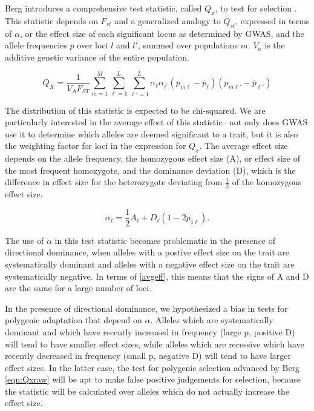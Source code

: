 \documentclass[a4paper,11pt]{article}
\begin{document}
Berg introduces a comprehensive test statistic, called $Q_x$, to test
for selection \cite{gwasintro}. This statistic depends on $F_{st}$ and
a generalized analogy to $Q_{st}$, expressed in terms of $\alpha$, or
the effect size of each significant locus as determined by GWAS, and
the allele frequencies $p$ over loci $l$ and $l'$, summed over
populations $m$. $V_a$ is the additive genetic variance of the entire population.

\begin{equation} \label{eqn:Qxraw}
  Q_X = \frac{1}{V_A F_{ST}} \sum_{m=1}^M \sum_{\ell=1}^L \sum_{\ell\prime=1}^L \alpha_{\ell} \alpha_{\ell^{\prime}}\left(p_{m\ell} - \overline{p}_\ell \right)\left(p_{m \ell\prime} - \overline{p}_{\ell\prime}\right)
\end{equation}

The distribution of this statistic is expected to be chi-squared. We are particularly interested in the average effect of this
statistic-- not only does GWAS use it to determine which alleles are deemed
significant to a trait, but it is also the weighting factor for loci in the
expression for $Q_x$. The average effect size depends on the allele
frequency, the homozygous effect size (A), or effect size of the most frequent homozygote, and the
dominance deviation (D), which is the difference in effect size for the heterozygote
deviating from $\frac{1}{2}$ of the homozygous effect size.

\begin{equation}  
  \alpha_\ell = \frac{1}{2} A_\ell + D_\ell\left(1-2p_{1\ell}\right).
  \label{avgeff}
\end{equation}

The use of $\alpha$ in this test statistic becomes problematic in the
presence of directional dominance, when alleles with a postive effect
size on the trait are systematically dominant and alleles with a
negative effect size on the trait are systematically negative. In
terms of \eqref{avgeff}, this means that the signs of A and D are the
same for a large number of loci.

In the presence of directional dominance, we hypothesized a bias in
tests for polygenic adaptation that depend on $\alpha$. Alleles which
are systematically dominant and which have recently increased in
frequency (large p, positive D) will tend to have smaller effect sizes, while
alleles which are recessive which have recently decreased in frequency
(small p, negative D) will tend to have larger effect sizes. In the
latter case, the test for polygenic selection advanced by Berg
\eqref{eqn:Qxraw} will be apt to make false positive judgements for
selection, because the statistic will be calculated over alleles which
do not actually increase the effect size.
\end{document}
